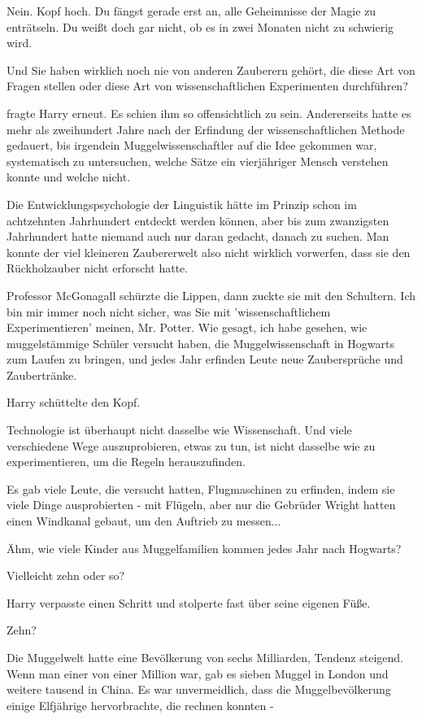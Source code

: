Nein. Kopf hoch. Du fängst gerade erst an, alle Geheimnisse der Magie zu
enträtseln. Du weißt doch gar nicht, ob es in zwei Monaten nicht zu
schwierig wird.

\glqq Und Sie haben wirklich noch nie von anderen Zauberern gehört, die diese
Art von Fragen stellen oder diese Art von wissenschaftlichen Experimenten
durchführen?\grqq{}

fragte Harry erneut. Es schien ihm so offensichtlich zu sein. Andererseits hatte
es mehr als zweihundert Jahre nach der Erfindung der wissenschaftlichen
Methode gedauert, bis irgendein Muggelwissenschaftler auf die Idee gekommen
war, systematisch zu untersuchen, welche Sätze ein vierjähriger Mensch
verstehen konnte und welche nicht.

Die Entwicklungspsychologie der Linguistik hätte im Prinzip schon im achtzehnten
Jahrhundert entdeckt werden können, aber bis zum zwanzigsten Jahrhundert
hatte niemand auch nur daran gedacht, danach zu suchen. Man konnte der viel
kleineren Zaubererwelt also nicht wirklich vorwerfen, dass sie den
Rückholzauber nicht erforscht hatte.

Professor McGonagall schürzte die Lippen, dann zuckte sie mit den Schultern.
\glqq Ich bin mir immer noch nicht sicher, was Sie mit 'wissenschaftlichem
Experimentieren' meinen, Mr. Potter. Wie gesagt, ich habe gesehen, wie
muggelstämmige Schüler versucht haben, die Muggelwissenschaft in Hogwarts
zum Laufen zu bringen, und jedes Jahr erfinden Leute neue Zaubersprüche und
Zaubertränke.\grqq{}

Harry schüttelte den Kopf.

\glqq Technologie ist überhaupt nicht dasselbe wie Wissenschaft. Und viele
verschiedene Wege auszuprobieren, etwas zu tun, ist nicht dasselbe wie zu
experimentieren, um die Regeln herauszufinden.\grqq{}

Es gab viele Leute, die versucht hatten, Flugmaschinen zu erfinden, indem sie
viele Dinge ausprobierten - mit Flügeln, aber nur die Gebrüder Wright hatten
einen Windkanal gebaut, um den Auftrieb zu messen...

\glqq Ähm, wie viele Kinder aus Muggelfamilien kommen jedes Jahr nach
Hogwarts?\grqq{}

\glqq Vielleicht zehn oder so?\grqq{}

Harry verpasste einen Schritt und stolperte fast über seine eigenen Füße.

\glqq Zehn?\grqq{}

Die Muggelwelt hatte eine Bevölkerung von sechs Milliarden, Tendenz steigend.
Wenn man einer von einer Million war, gab es sieben Muggel in London und
weitere tausend in China. Es war unvermeidlich, dass die Muggelbevölkerung
einige Elfjährige hervorbrachte, die rechnen konnten -

